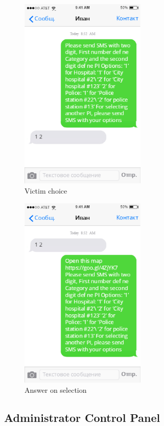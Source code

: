 \begin{figure}
  \centering
    \includegraphics[width=6cm]{images/mockups/feature3-PI/2.eps}
  \caption{Victim choice}
  \label{fig:Victimchoice}
\end{figure}  


\begin{figure}
  \centering
    \includegraphics[width=6cm]{images/mockups/feature3-PI/3.eps}
  \caption{Answer on selection}
  \label{fig:Answeronselection}
\end{figure}

\subsection{Administrator Control Panel}

